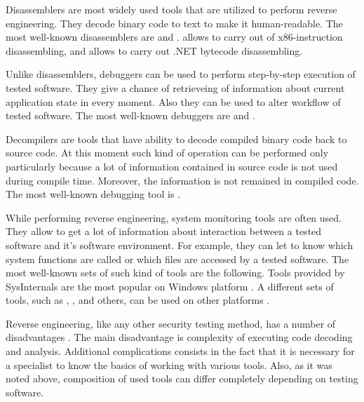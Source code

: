 %
Disassemblers are most widely used tools that are utilized to perform reverse engineering. 
%
They decode binary code to text to make it human-readable. 
%
The most well-known disassemblers are   and  . 
%
 allows to carry out of x86-instruction disassembling, and  allows to carry out .NET  bytecode disassembling. 

%
Unlike disassemblers, debuggers can be used to perform step-by-step execution of tested software. 
%
They give a chance of retrieveing of information about current application state in every moment. 
%
Also they can be used to alter workflow of tested software. 
%
The most well-known debuggers are   and  . 

%
Decompilers are tools that have ability to decode compiled binary code back to source code. 
%
At this moment such kind of operation can be performed only particularly because a lot of information contained in source code is not used during compile time. 
%
Moreover, the information is not remained in compiled code. 
%
The most well-known debugging tool is  . 

%
While performing reverse engineering, system monitoring tools are often used. 
%
They allow to get a lot of information about interaction between a tested software and it's software environment. 
%
For example, they can let to know which system functions are called or which files are accessed by a tested software. 
%
The most well-known sets of such kind of tools are the following. 
%
Tools provided by SysInternals  are the most popular on Windows platform . 
%
A different sets of tools, such as , , and others, can be used on other platforms . 

%
Reverse engineering, like any other security testing method, has a number of disadvantages . 
%
The main disadvantage is complexity of executing code decoding and analysis. 
%
Additional complications consists in the fact that it is necessary for a specialist to know the basics of working with various tools. 
%
Also, as it was noted above, composition of used tools can differ completely depending on testing software. 

